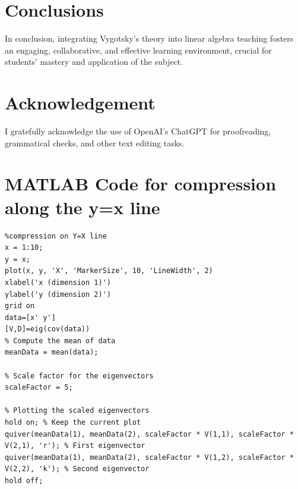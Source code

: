 \documentclass{article}
\begin{document}
\section{Conclusions}
\label{sec:conclusion}
In conclusion, integrating Vygotsky's theory into linear algebra teaching fosters an engaging, collaborative, and effective learning environment, crucial for students' mastery and application of the subject.

\section*{Acknowledgement}
I gratefully acknowledge the use of OpenAI's ChatGPT for proofreading, grammatical checks, and other text editing tasks.

\medskip

\printbibliography

\appendix
\renewcommand{\thesection}{Appendix \Alph{section}}

\section{MATLAB Code for compression along the y=x line}
\label{appendix:compressionyx}
\begin{lstlisting}
%compression on Y=X line
x = 1:10;
y = x;
plot(x, y, 'X', 'MarkerSize', 10, 'LineWidth', 2)
xlabel('x (dimension 1)')
ylabel('y (dimension 2)')
grid on
data=[x' y']
[V,D]=eig(cov(data))
% Compute the mean of data
meanData = mean(data);

% Scale factor for the eigenvectors
scaleFactor = 5;

% Plotting the scaled eigenvectors
hold on; % Keep the current plot
quiver(meanData(1), meanData(2), scaleFactor * V(1,1), scaleFactor * V(2,1), 'r'); % First eigenvector
quiver(meanData(1), meanData(2), scaleFactor * V(1,2), scaleFactor * V(2,2), 'k'); % Second eigenvector
hold off;

\end{lstlisting}
\end{document}
